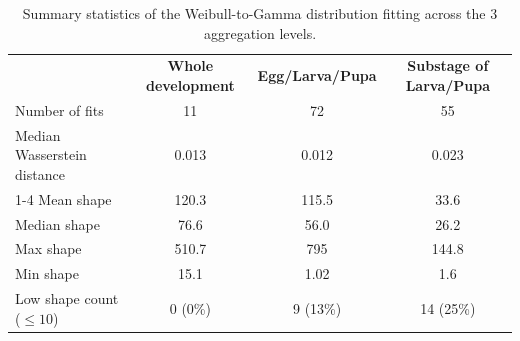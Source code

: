 \documentclass[12pt,a4paper,onecolumn]{article}
\begin{document}

\begin{table}[h]
\centering
\begin{tabular}{lccc}
\toprule
\textbf{} & \textbf{Whole development} & \textbf{Egg/Larva/Pupa} & \textbf{Substage of Larva/Pupa} \\
Number of fits & 11 & 72 & 55 \\ 
\midrule
Median Wasserstein distance & 0.013 & 0.012 & 0.023 \\
\cmidrule{1-4}
Mean shape & 120.3 & 115.5 & 33.6 \\
Median shape & 76.6 & 56.0 & 26.2 \\
Max shape & 510.7 & 795 & 144.8 \\
Min shape & 15.1 & 1.02 & 1.6 \\
Low shape count ($\leq 10$) & 0 (0\%) & 9 (13\%) & 14 (25\%) \\
\bottomrule
\end{tabular}
\caption{Summary statistics of the Weibull-to-Gamma distribution fitting across the 3 aggregation levels.}
\end{table}
\end{document}
